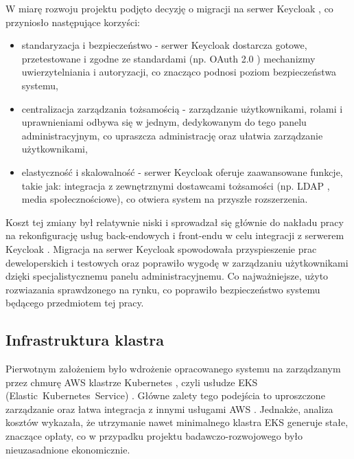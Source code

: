 W miarę rozwoju projektu podjęto decyzję o migracji na serwer Keycloak \cite{keycloak_docs}, co przyniosło następujące korzyści:
\begin{itemize}
    \item standaryzacja i bezpieczeństwo - serwer Keycloak \cite{keycloak_docs} dostarcza gotowe, przetestowane i zgodne ze standardami (np. OAuth 2.0 \cite{oauth2_rfc}) mechanizmy uwierzytelniania i autoryzacji, co znacząco podnosi poziom bezpieczeństwa systemu,
    \item centralizacja zarządzania tożsamością - zarządzanie użytkownikami, rolami i uprawnieniami odbywa się w jednym, dedykowanym do tego panelu administracyjnym, co upraszcza administrację oraz ułatwia zarządzanie użytkownikami,
    \item elastyczność i skalowalność - serwer Keycloak \cite{keycloak_docs} oferuje zaawansowane funkcje, takie jak: integracja z zewnętrznymi dostawcami tożsamości (np. LDAP \cite{ldap_rfc}, media społecznościowe), co otwiera system na przyszłe rozszerzenia.
\end{itemize}

\vspace{0.3em}

Koszt tej zmiany był relatywnie niski i sprowadzał się głównie do nakładu pracy na rekonfigurację usług back-endowych i front-endu w celu integracji z serwerem Keycloak \cite{keycloak_docs}. Migracja na serwer Keycloak \cite{keycloak_docs} spowodowała przyspieszenie prac deweloperskich i testowych oraz poprawiło wygodę w zarządzaniu użytkownikami dzięki specjalistycznemu panelu administracyjnemu. Co najważniejsze, użyto rozwiazania sprawdzonego na rynku, co poprawiło bezpieczeństwo systemu będącego przedmiotem tej pracy.

\subsection{Infrastruktura klastra}

Pierwotnym założeniem było wdrożenie opracowanego systemu na zarządzanym przez chmurę AWS \cite{aws_docs} klastrze Kubernetes \cite{kubernetes}, czyli usłudze EKS (\mbox{Elastic Kubernetes Service}) \cite{eks_docs}. Główne zalety tego podejścia to uproszczone zarządzanie oraz łatwa integracja z innymi usługami AWS \cite{aws_docs}. Jednakże, analiza kosztów wykazała, że utrzymanie nawet minimalnego klastra EKS \cite{eks_docs} generuje stałe, znaczące opłaty, co w przypadku projektu badawczo-rozwojowego było nieuzasadnione ekonomicznie.

